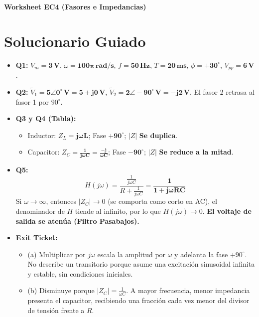 \documentclass[11pt, a4paper]{article}
\begin{document}
\newpage
\begin{tcolorbox}[colback=warnred!5!white, colframe=warnred, title=\textbf{CLAVE DOCENTE EXCLUSIVA — NO DISTRIBUIR EN LA HOJA DEL ESTUDIANTE}]
    \centering \textbf{Worksheet EC4 (Fasores e Impedancias)}
\end{tcolorbox}

\section*{Solucionario Guiado}
\begin{itemize}\setlength\itemsep{0.2cm}
    \item \textbf{Q1:} $V_m = \mathbf{3\,\text{V}}$, $\omega = \mathbf{100\pi\,\text{rad/s}}$, $f = \mathbf{50\,\text{Hz}}$, $T = \mathbf{20\,\text{ms}}$, $\phi = \mathbf{+30^\circ}$, $V_{pp} = \mathbf{6\,\text{V}}$.
    \item \textbf{Q2:} $\tilde{V}_1 = \mathbf{5\angle 0^\circ\,\text{V} = 5 + j0\,\text{V}}$, $\tilde{V}_2 = \mathbf{2\angle -90^\circ\,\text{V} = -j2\,\text{V}}$. El fasor 2 retrasa al fasor 1 por $90^\circ$.
    \item \textbf{Q3 y Q4 (Tabla):}
    \begin{itemize}
        \item Inductor: $Z_L = \mathbf{j\omega L}$; Fase $\mathbf{+90^\circ}$; $|Z|$ \textbf{Se duplica}.
        \item Capacitor: $Z_C = \mathbf{\frac{1}{j\omega C} = \frac{-j}{\omega C}}$; Fase $\mathbf{-90^\circ}$; $|Z|$ \textbf{Se reduce a la mitad}.
    \end{itemize}
    \item \textbf{Q5:}
    $$ H(j\omega) = \frac{\frac{1}{j\omega C}}{R + \frac{1}{j\omega C}} = \mathbf{\frac{1}{1 + j\omega RC}} $$
    Si $\omega \to \infty$, entonces $|Z_C| \to 0$ (se comporta como corto en AC), el denominador de $H$ tiende al infinito, por lo que $H(j\omega) \to 0$. \textbf{El voltaje de salida se atenúa (Filtro Pasabajos).}
    \item \textbf{Exit Ticket:} 
    \begin{itemize}
        \item (a) Multiplicar por $j\omega$ escala la amplitud por $\omega$ y adelanta la fase $+90^\circ$. No describe un transitorio porque asume una excitación sinusoidal infinita y estable, sin condiciones iniciales.
        \item (b) Disminuye porque $|Z_C| = \frac{1}{\omega C}$. A mayor frecuencia, menor impedancia presenta el capacitor, recibiendo una fracción cada vez menor del divisor de tensión frente a $R$.
    \end{itemize}
\end{itemize}
\end{document}
